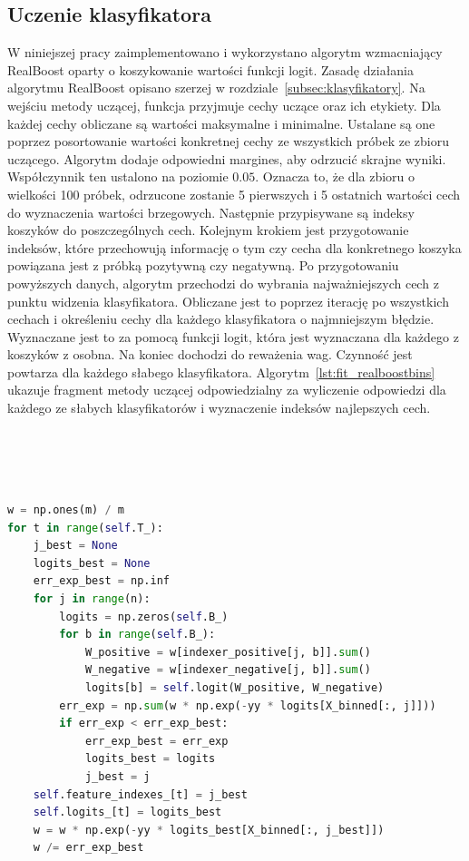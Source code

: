 \subsection{Uczenie klasyfikatora}
W niniejszej pracy zaimplementowano i wykorzystano algorytm wzmacniający RealBoost oparty o koszykowanie wartości funkcji logit.
Zasadę działania algorytmu RealBoost opisano szerzej w rozdziale~\ref{subsec:klasyfikatory}.
Na wejściu metody uczącej, funkcja przyjmuje cechy uczące oraz ich etykiety.
Dla każdej cechy obliczane są wartości maksymalne i minimalne.
Ustalane są one poprzez posortowanie wartości konkretnej cechy ze wszystkich próbek ze zbioru uczącego.
Algorytm dodaje odpowiedni margines, aby odrzucić skrajne wyniki.
Współczynnik ten ustalono na poziomie $0.05$.
Oznacza to, że dla zbioru o wielkości 100 próbek, odrzucone zostanie 5 pierwszych i 5 ostatnich wartości cech do wyznaczenia wartości brzegowych.
Następnie przypisywane są indeksy koszyków do poszczególnych cech.
Kolejnym krokiem jest przygotowanie indeksów, które przechowują informację o tym czy cecha dla konkretnego koszyka powiązana jest z próbką pozytywną czy negatywną.
Po przygotowaniu powyższych danych, algorytm przechodzi do wybrania najważniejszych cech z punktu widzenia klasyfikatora.
Obliczane jest to poprzez iterację po wszystkich cechach i określeniu cechy dla każdego klasyfikatora o najmniejszym błędzie.
Wyznaczane jest to za pomocą funkcji logit, która jest wyznaczana dla każdego z koszyków z osobna.
Na koniec dochodzi do reważenia wag.
Czynność jest powtarza dla każdego słabego klasyfikatora.
Algorytm~\ref{lst:fit_realboostbins} ukazuje fragment metody uczącej odpowiedzialny za wyliczenie odpowiedzi dla każdego ze słabych klasyfikatorów i wyznaczenie indeksów najlepszych cech.\\\\\\\\\\
\begin{lstlisting}[language=Python, caption=Procedura ucząca klasyfikator RealBoostBins., label={lst:fit_realboostbins}]
w = np.ones(m) / m
for t in range(self.T_):
    j_best = None
    logits_best = None
    err_exp_best = np.inf
    for j in range(n):
        logits = np.zeros(self.B_)
        for b in range(self.B_):
            W_positive = w[indexer_positive[j, b]].sum()
            W_negative = w[indexer_negative[j, b]].sum()
            logits[b] = self.logit(W_positive, W_negative)
        err_exp = np.sum(w * np.exp(-yy * logits[X_binned[:, j]]))
        if err_exp < err_exp_best:
            err_exp_best = err_exp
            logits_best = logits
            j_best = j
    self.feature_indexes_[t] = j_best
    self.logits_[t] = logits_best
    w = w * np.exp(-yy * logits_best[X_binned[:, j_best]])
    w /= err_exp_best

\end{lstlisting}
